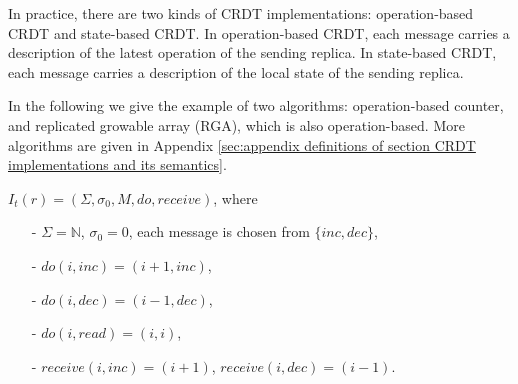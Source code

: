 In practice, there are two kinds of CRDT implementations: operation-based CRDT and state-based CRDT. In operation-based CRDT, each message carries a description of the latest operation of the sending replica. In state-based CRDT, each message carries a description of the local state of the sending replica.

In the following we give the example of two algorithms: operation-based counter, and replicated growable array (RGA), which is also operation-based. More algorithms are given in Appendix \ref{sec:appendix definitions of section CRDT implementations and its semantics}.

\begin{example}
\label{definition:operation-based counter}
$I_t(r) = (\Sigma, \sigma_0, M, \mathit{do},\mathit{receive})$, where

\begin{itemize}
\setlength{\itemsep}{0.5pt}
\item[-] $\Sigma = \mathbb{N}$, $\sigma_0 = 0$, each message is chosen from $\{ \mathit{inc}, \mathit{dec} \}$,

\item[-] $\mathit{do}(i,\mathit{inc}) = (i+1,\mathit{inc})$,

\item[-] $\mathit{do}(i,\mathit{dec}) = (i-1,\mathit{dec})$,

\item[-] $\mathit{do}(i,\mathit{read}) = (i,i)$,

\item[-] $\mathit{receive}(i,\mathit{inc}) = (i+1)$, $\mathit{receive}(i,\mathit{dec}) = (i-1)$.
\end{itemize}
\end{example}


